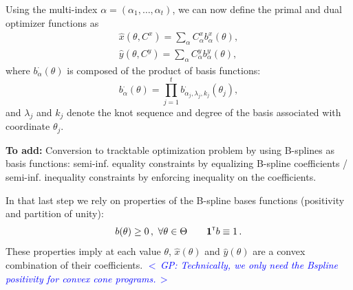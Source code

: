 \documentclass{article}
\renewcommand{\t}{^{\mbox{\tiny \sf T}}}    %
\newcommand{\ppar}{\theta}                  %
\newcommand{\Ppar}{\Theta}                  %
\newcommand{\commentGP}[1]{\noindent \textcolor{blue}{\emph{$<\,$GP: #1$\,>$}}}%
\begin{document}
Using the multi-index $\alpha=(\alpha_1, \ldots, \alpha_t)$, we can now
define the primal and dual optimizer functions as
\[
\begin{gathered}
\hat{x}(\ppar, C^x) = \sum_\alpha C^x_\alpha b^x_\alpha(\ppar), \\
\hat{y}(\ppar, C^y) = \sum_\alpha C^y_\alpha b^y_\alpha(\ppar),
\end{gathered}
\]
where $b_\alpha^\cdot(\ppar)$ is composed of the product of basis functions:
\[
b_\alpha^\cdot(\ppar) = \prod_{j=1}^t b^\cdot_{\alpha_j, \lambda_j,
k_j}(\ppar_j),
\]
and $\lambda_j$ and $k_j$ denote the knot sequence and degree of the basis
associated with coordinate $\ppar_j$.

\vspace*{12pt}
\noindent\textbf{To add:} Conversion to tracktable optimization problem by using B-splines as basis functions: semi-inf. equality constraints by equalizing B-spline coefficients / semi-inf. inequality constraints by enforcing inequality on the coefficients.

In that last step we rely on properties of the B-spline bases functions (positivity and partition of unity):
\[ b(\ppar)\geq0\,,~\forall\ppar\in\Ppar \qquad \mathbf{1}\t b \equiv 1\,.%
\]
These properties imply at each value $\ppar$, $\hat{x}(\ppar)$ and $\hat{y}(\ppar)$ are a convex combination of their coefficients. \commentGP{Technically, we only need the Bspline positivity for convex cone programs.}
\end{document}
